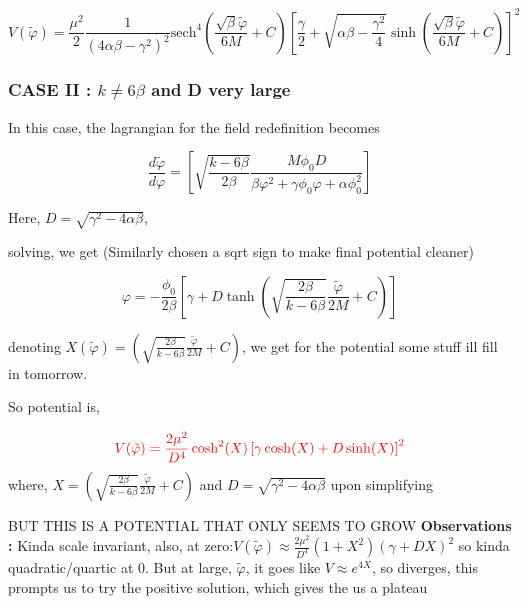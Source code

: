 \documentclass{article}
\begin{document}
\begin{equation}
    V(\tilde{\varphi}) = \frac{\mu^2}{2} \frac{1}{(4\alpha\beta-\gamma^2)^2} \text{sech}^4\left(\frac{\sqrt{\beta}\tilde{\varphi}}{6M}+C \right) \left[\frac{\gamma }{2} + \sqrt{\alpha\beta-\frac{\gamma^2}{4}} \sinh\left(\frac{\sqrt{\beta}\tilde{\varphi}}{6M}+C \right) \right]^2
\end{equation}

\subsubsection{CASE II : $k \neq 6\beta$ and D very large}

In this case, the lagrangian for the field redefinition becomes

\begin{equation}
    \frac{d\tilde{\varphi}}{d\varphi} = \left[ \sqrt{\frac{k-6\beta}{2\beta}} \frac{M \phi_0 D}{\beta \varphi^2  +\gamma \phi_0 \varphi +\alpha \phi^2_0} \right]
\end{equation}

Here,  $D = \sqrt{ \gamma^2-4\alpha \beta}$, 

solving, we get (Similarly chosen a sqrt sign to make final potential cleaner)

\begin{equation}
    \varphi = -\frac{\phi_0}{2 \beta} \left[ \gamma + D\tanh \left( \sqrt{\frac{2\beta}{k-6\beta}} \frac{\tilde{\varphi}}{2M} + C \right) \right]
\end{equation}

denoting $X(\tilde{\varphi}) = \left( \sqrt{\frac{2\beta}{k-6\beta}} \frac{\tilde{\varphi}}{2M} + C \right)$, we get for the potential some stuff ill fill in tomorrow.

So potential is, 

\begin{equation}
    \color{red} V(\tilde{\varphi}) =  \frac{2\mu^2}{D^4} \cosh^2(X)  \left[\gamma \cosh(X)  + D \sinh(X)  \right]^2
\end{equation}
where, 
$X = \left( \sqrt{\frac{2\beta}{k-6\beta}} \frac{\tilde{\varphi}}{2M} + C \right)$ and $D = \sqrt{\gamma^2-4\alpha\beta}$ upon simplifying

BUT THIS IS A POTENTIAL THAT ONLY SEEMS TO GROW \textbf{Observations : } Kinda scale invariant, also, at zero:$ V(\tilde{\varphi}) \approx  \frac{2\mu^2}{D^4} (1 + X^2) (\gamma + DX)^2$
so kinda quadratic/quartic at 0. But at large, $\tilde{\varphi}$, it goes like $V \approx e^{4X}$, so diverges, this prompts us to try the positive solution, which gives the us a plateau
\end{document}
